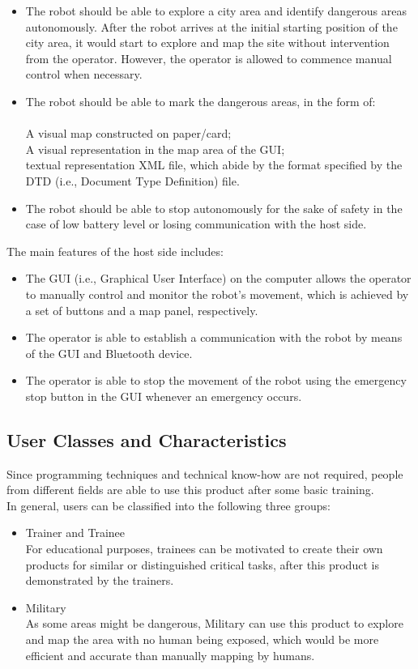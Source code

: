 \documentclass[titlepage]{article}
\begin{document}
\begin{itemize}


\item The robot should be able to explore a city area and identify dangerous areas autonomously. After the robot arrives at the initial starting position of the city area, it would start to explore and map the site without intervention from the operator. However, the operator is allowed to commence manual control when necessary.
\item The robot should be able to mark the dangerous areas, in the form of:\\
\\
A visual map constructed on paper/card;
\\
A visual representation in the map area of the GUI;
\\
textual representation XML file, which abide by the format specified by the DTD (i.e., Document Type Definition) file.
\item The robot should be able to stop autonomously for the sake of safety in the case of low battery level or losing communication with the host side.
\end{itemize}
The main features of the host side includes:
\begin{itemize}
\item The GUI (i.e., Graphical User Interface) on the computer allows the operator to manually control and monitor the robot's movement, which is achieved by a set of buttons and a map panel, respectively.
\item The operator is able to establish a communication with the robot by means of the GUI and Bluetooth device.
\item The operator is able to stop the movement of the robot using the emergency stop button in the GUI whenever an emergency occurs.
\end{itemize}



\subsection{User Classes and Characteristics}
Since programming techniques and technical know-how are not required, people from different fields are able to use this product after some basic training.
\\
In general, users can be classified into the following three groups:
\begin{itemize}
\item Trainer and Trainee
\\
For educational purposes, trainees can be motivated to create their own products for similar or distinguished critical tasks, after this product is demonstrated by the trainers.
\item Military
\\
As some areas might be dangerous, Military can use this product to explore and map the area with no human being exposed, which would be more efficient and accurate than manually mapping by humans.
\end{itemize}
\end{document}
